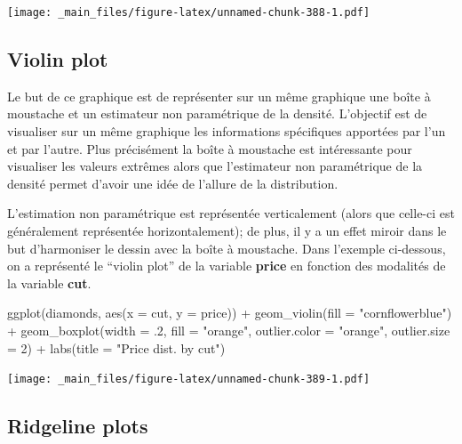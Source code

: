 \documentclass[
]{book}
\newenvironment{Shaded}{\begin{snugshade}}{\end{snugshade}}
\newcommand{\AttributeTok}[1]{\textcolor[rgb]{0.77,0.63,0.00}{#1}}
\newcommand{\DecValTok}[1]{\textcolor[rgb]{0.00,0.00,0.81}{#1}}
\newcommand{\FunctionTok}[1]{\textcolor[rgb]{0.00,0.00,0.00}{#1}}
\newcommand{\NormalTok}[1]{#1}
\newcommand{\SpecialCharTok}[1]{\textcolor[rgb]{0.00,0.00,0.00}{#1}}
\newcommand{\StringTok}[1]{\textcolor[rgb]{0.31,0.60,0.02}{#1}}
\theoremstyle{definition}
\theoremstyle{definition}
\theoremstyle{definition}
\theoremstyle{definition}
\theoremstyle{remark}
\begin{document}
\texttt{[image: \_main\_files/figure-latex/unnamed-chunk-388-1.pdf]}

\hypertarget{violin-plot}{%
\subsection{Violin plot}\label{violin-plot}}

Le but de ce graphique est de représenter sur un même graphique une boîte à moustache et un estimateur non paramétrique de la densité. L'objectif est de visualiser sur un même graphique les informations spécifiques apportées par l'un et par l'autre. Plus précisément la boîte à moustache est intéressante pour visualiser les valeurs extrêmes alors que l'estimateur non paramétrique de la densité permet d'avoir une idée de l'allure de la distribution.

L'estimation non paramétrique est représentée verticalement (alors que celle-ci est généralement représentée horizontalement); de plus, il y a un effet miroir dans le but d'harmoniser le dessin avec la boîte à moustache. Dans l'exemple ci-dessous, on a représenté le ``violin plot'' de la variable \textbf{price} en fonction des modalités de la variable \textbf{cut}.

\begin{Shaded}
\begin{Highlighting}[]
\FunctionTok{ggplot}\NormalTok{(diamonds, }
       \FunctionTok{aes}\NormalTok{(}\AttributeTok{x =}\NormalTok{ cut, }
           \AttributeTok{y =}\NormalTok{ price)) }\SpecialCharTok{+}
  \FunctionTok{geom\_violin}\NormalTok{(}\AttributeTok{fill =} 
          \StringTok{"cornflowerblue"}\NormalTok{) }\SpecialCharTok{+}
  \FunctionTok{geom\_boxplot}\NormalTok{(}\AttributeTok{width =}\NormalTok{ .}\DecValTok{2}\NormalTok{, }
        \AttributeTok{fill =} \StringTok{"orange"}\NormalTok{,}
        \AttributeTok{outlier.color =} \StringTok{"orange"}\NormalTok{,}
        \AttributeTok{outlier.size =} \DecValTok{2}\NormalTok{) }\SpecialCharTok{+} 
  \FunctionTok{labs}\NormalTok{(}\AttributeTok{title =} \StringTok{"Price dist. by cut"}\NormalTok{)}
\end{Highlighting}
\end{Shaded}

\texttt{[image: \_main\_files/figure-latex/unnamed-chunk-389-1.pdf]}

\hypertarget{ridgeline-plots}{%
\subsection{Ridgeline plots}\label{ridgeline-plots}}
\end{document}
